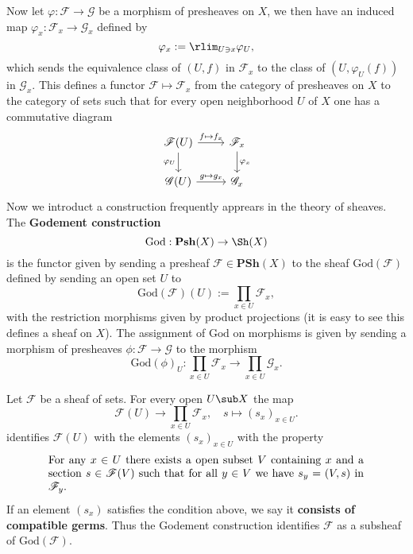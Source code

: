 Now let $\varphi:\mathscr{F}\to\mathscr{G}$ be a morphism of presheaves on $X$, we then have an induced map $\varphi_x:\mathscr{F}_x\to\mathscr{G}_x$ defined by
\[\varphi_x:=\rlim_{U\ni x}\varphi_U,\]
which sends the equivalence class of $(U,f)$ in $\mathscr{F}_x$ to the class of $(U,\varphi_U(f))$ in $\mathscr{G}_x$. This defines a functor $\mathscr{F}\mapsto\mathscr{F}_x$ from the category of presheaves on $X$ to the category of sets such that for every open neighborhood $U$ of $X$ one has a commutative diagram
\begin{equation}\label{presheaf morphism induced on stalk}
\begin{tikzcd}
\mathscr{F}(U)\ar[r,"f\mapsto f_x"]\ar[d,swap,"\varphi_U"]&\mathscr{F}_x\ar[d,"\varphi_x"]\\
\mathscr{G}(U)\ar[r,"g\mapsto g_x"]&\mathscr{G}_x
\end{tikzcd}
\end{equation}
Now we introduct a construction frequently apprears in the theory of sheaves. The \textbf{Godement construction} 
\[\mathrm{God}:\mathbf{Psh}(X)\to\Sh(X)\]
is the functor given by sending a presheaf $\mathscr{F}\in\mathbf{PSh}(X)$ to the sheaf $\mathrm{God}(\mathscr{F})$ defined by sending an open set $U$ to
\[\mathrm{God}(\mathscr{F})(U):=\prod_{x\in U}\mathscr{F}_x,\]
with the restriction morphisms given by product projections (it is easy to see this defines a sheaf on $X$). The assignment of $\mathrm{God}$ on morphisms is given by sending a morphism of presheaves $\phi:\mathscr{F}\to\mathscr{G}$ to the morphism
\[\mathrm{God}(\phi)_U:\prod_{x\in U}\mathscr{F}_x\to\prod_{x\in U}\mathscr{G}_x.\]
\begin{proposition}\label{Goement construction image of sheaf char}
Let $\mathscr{F}$ be a sheaf of sets. For every open $U\sub X$ the map
\[\mathscr{F}(U)\to\prod_{x\in U}\mathscr{F}_x,\quad s\mapsto (s_x)_{x\in U}.\]
identifies $\mathscr{F}(U)$ with the elements $(s_x)_{x\in U}$ with the property
\begin{equation*}
\parbox{\dimexpr\linewidth-6em}
{\strut
For any $x\in U$ there exists a open subset $V$ containing $x$ and a section $s\in\mathscr{F}(V)$ such that for all $y\in V$ we have $s_y=(V,s)$ in $\mathscr{F}_y$.
\strut}
\end{equation*}
If an element $(s_x)$ satisfies the condition above, we say it \textbf{consists of compatible germs}. Thus the Godement construction identifies $\mathscr{F}$ as a subsheaf of $\mathrm{God}(\mathscr{F})$.
\end{proposition}

